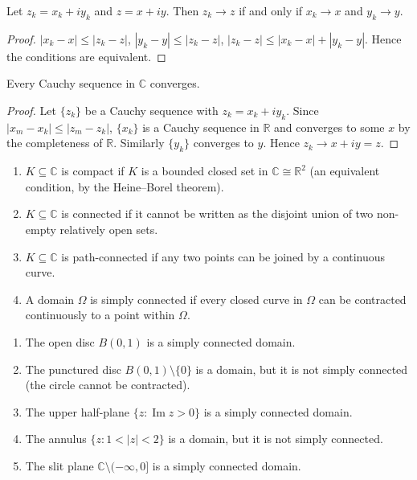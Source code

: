 \begin{proposition}\label{prop:ca_seq_coordinate}
Let $z_k = x_k + i y_k$ and $z = x + iy$. Then $z_k \to z$ if and only if $x_k \to x$ and $y_k \to y$.
\end{proposition}

\begin{proof}
$|x_k - x| \le |z_k - z|$, $|y_k - y| \le |z_k - z|$, $|z_k - z| \le |x_k - x| + |y_k - y|$. Hence the conditions are equivalent.
\end{proof}

\begin{theorem}\label{thm:ca_completeness}
Every Cauchy sequence in $\mathbb{C}$ converges.
\end{theorem}

\begin{proof}
Let $\{z_k\}$ be a Cauchy sequence with $z_k = x_k + iy_k$. Since $|x_m - x_k| \le |z_m - z_k|$, $\{x_k\}$ is a Cauchy sequence in $\mathbb{R}$ and converges to some $x$ by the completeness of $\mathbb{R}$. Similarly $\{y_k\}$ converges to $y$. Hence $z_k \to x + iy = z$.
\end{proof}

\begin{definition}\label{def:ca_compact_connected}
\begin{enumerate}[label=(\roman*)]
    \item $K \subseteq \mathbb{C}$ is compact if $K$ is a bounded closed set in $\mathbb{C} \cong \mathbb{R}^2$ (an equivalent condition, by the Heine--Borel theorem).
    \item $K \subseteq \mathbb{C}$ is connected if it cannot be written as the disjoint union of two non-empty relatively open sets.
    \item $K \subseteq \mathbb{C}$ is path-connected if any two points can be joined by a continuous curve.
    \item A domain $\Omega$ is simply connected if every closed curve in $\Omega$ can be contracted continuously to a point within $\Omega$.
\end{enumerate}
\end{definition}

\begin{example}\label{ex:ca_topology_examples}
\begin{enumerate}[label=(\roman*)]
    \item The open disc $B(0, 1)$ is a simply connected domain.
    \item The punctured disc $B(0, 1) \setminus \{0\}$ is a domain, but it is not simply connected (the circle cannot be contracted).
    \item The upper half-plane $\{z : \operatorname{Im} z > 0\}$ is a simply connected domain.
    \item The annulus $\{z : 1 < |z| < 2\}$ is a domain, but it is not simply connected.
    \item The slit plane $\mathbb{C} \setminus (-\infty, 0]$ is a simply connected domain.
\end{enumerate}
\end{example}

